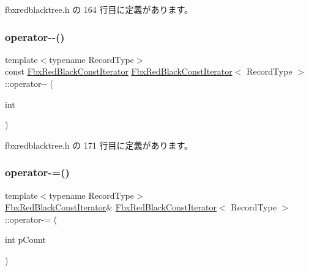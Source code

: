  fbxredblacktree.\+h の 164 行目に定義があります。

\mbox{\label{class_fbx_red_black_const_iterator_a1adca987fe31d11713b227487cccc6a4}} 
\subsubsection{\texorpdfstring{operator-\/-\/()}{operator--()}\hspace{0.1cm}{\footnotesize\ttfamily [2/2]}}
{\footnotesize\ttfamily template$<$typename Record\+Type$>$ \\
const \hyperlink{class_fbx_red_black_const_iterator}{Fbx\+Red\+Black\+Const\+Iterator} \hyperlink{class_fbx_red_black_const_iterator}{Fbx\+Red\+Black\+Const\+Iterator}$<$ Record\+Type $>$\+::operator-\/-\/ (\begin{DoxyParamCaption}\item[{int}]{ }\end{DoxyParamCaption})\hspace{0.3cm}{\ttfamily [inline]}}



 fbxredblacktree.\+h の 171 行目に定義があります。

\mbox{\label{class_fbx_red_black_const_iterator_a8d6e308711ba1c94309dd7f9efde946d}} 
\subsubsection{\texorpdfstring{operator-\/=()}{operator-=()}}
{\footnotesize\ttfamily template$<$typename Record\+Type$>$ \\
\hyperlink{class_fbx_red_black_const_iterator}{Fbx\+Red\+Black\+Const\+Iterator}\& \hyperlink{class_fbx_red_black_const_iterator}{Fbx\+Red\+Black\+Const\+Iterator}$<$ Record\+Type $>$\+::operator-\/= (\begin{DoxyParamCaption}\item[{int}]{p\+Count }\end{DoxyParamCaption})\hspace{0.3cm}{\ttfamily [inline]}}



